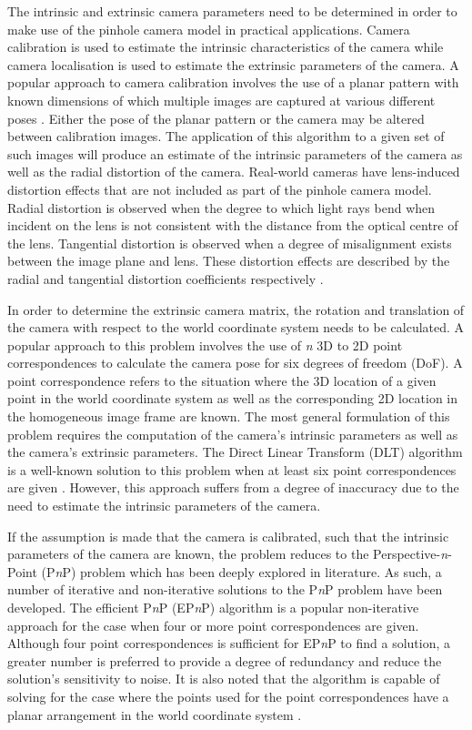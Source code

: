 The intrinsic and extrinsic camera parameters need to be determined in order to make use of the pinhole camera model in practical applications. Camera calibration is used to estimate the intrinsic characteristics of the camera while camera localisation is used to estimate the extrinsic parameters of the camera. A popular approach to camera calibration involves the use of a planar pattern with known dimensions of which multiple images are captured at various different poses \cite{Zhang:A_Flexible_Camera_Calibration_Technique}. Either the pose of the planar pattern or the camera may be altered between calibration images. The application of this algorithm to a given set of such images will produce an estimate of the intrinsic parameters of the camera as well as the radial distortion of the camera. Real-world cameras have lens-induced distortion effects that are not included as part of the pinhole camera model. Radial distortion is observed when the degree to which light rays bend when incident on the lens is not consistent with the distance from the optical centre of the lens. Tangential distortion is observed when a degree of misalignment exists between the image plane and lens. These distortion effects are described by the radial and tangential distortion coefficients respectively \cite{MathWorks:Camera_Calibration}.

In order to determine the extrinsic camera matrix, the rotation and translation of the camera with respect to the world coordinate system needs to be calculated. A popular approach to this problem involves the use of \textit{n} 3D to 2D point correspondences to calculate the camera pose for six degrees of freedom (DoF). A point correspondence refers to the situation where the 3D location of a given point in the world coordinate system as well as the corresponding 2D location in the homogeneous image frame are known. The most general formulation of this problem requires the computation of the camera's intrinsic parameters as well as the camera's extrinsic parameters. The Direct Linear Transform (DLT) algorithm is a well-known solution to this problem when at least six point correspondences are given \cite{OpenCV:Textured_Object_Pose_Estimation}. However, this approach suffers from a degree of inaccuracy due to the need to estimate the intrinsic parameters of the camera.

If the assumption is made that the camera is calibrated, such that the intrinsic parameters of the camera are known, the problem reduces to the Perspective-\textit{n}-Point (P\textit{n}P) problem which has been deeply explored in literature. As such, a number of iterative and non-iterative solutions to the P\textit{n}P problem have been developed. The efficient P\textit{n}P (EP\textit{n}P) algorithm is a popular non-iterative approach for the case when four or more point correspondences are given. Although four point correspondences is sufficient for EP\textit{n}P to find a solution, a greater number is preferred to provide a degree of redundancy and reduce the solution's sensitivity to noise. It is also noted that the algorithm is capable of solving for the case where the points used for the point correspondences have a planar arrangement in the world coordinate system \cite{Lepetit:EPnP}.

